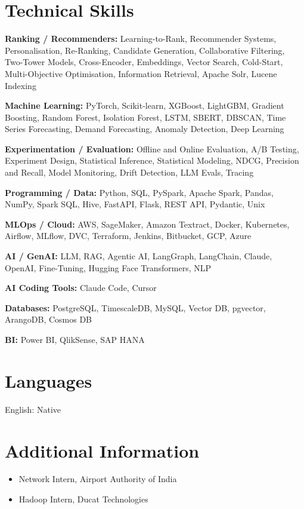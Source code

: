 \documentclass[10pt,a4paper]{article}
\begin{document}
\section{Technical Skills}
\textbf{Ranking / Recommenders:} Learning-to-Rank, Recommender Systems, Personalisation, Re-Ranking, Candidate Generation, Collaborative Filtering, Two-Tower Models, Cross-Encoder, Embeddings, Vector Search, Cold-Start, Multi-Objective Optimisation, Information Retrieval, Apache Solr, Lucene Indexing\par
\textbf{Machine Learning:} PyTorch, Scikit-learn, XGBoost, LightGBM, Gradient Boosting, Random Forest, Isolation Forest, LSTM, SBERT, DBSCAN, Time Series Forecasting, Demand Forecasting, Anomaly Detection, Deep Learning\par
\textbf{Experimentation / Evaluation:} Offline and Online Evaluation, A/B Testing, Experiment Design, Statistical Inference, Statistical Modeling, NDCG, Precision and Recall, Model Monitoring, Drift Detection, LLM Evals, Tracing\par
\textbf{Programming / Data:} Python, SQL, PySpark, Apache Spark, Pandas, NumPy, Spark SQL, Hive, FastAPI, Flask, REST API, Pydantic, Unix\par
\textbf{MLOps / Cloud:} AWS, SageMaker, Amazon Textract, Docker, Kubernetes, Airflow, MLflow, DVC, Terraform, Jenkins, Bitbucket, GCP, Azure\par
\textbf{AI / GenAI:} LLM, RAG, Agentic AI, LangGraph, LangChain, Claude, OpenAI, Fine-Tuning, Hugging Face Transformers, NLP\par
\textbf{AI Coding Tools:} Claude Code, Cursor\par
\textbf{Databases:} PostgreSQL, TimescaleDB, MySQL, Vector DB, pgvector, ArangoDB, Cosmos DB\par
\textbf{BI:} Power BI, QlikSense, SAP HANA\par

\section{Languages}
English: Native\par

\section{Additional Information}
\begin{itemize}
  \item Network Intern, Airport Authority of India
  \item Hadoop Intern, Ducat Technologies
\end{itemize}
\end{document}
